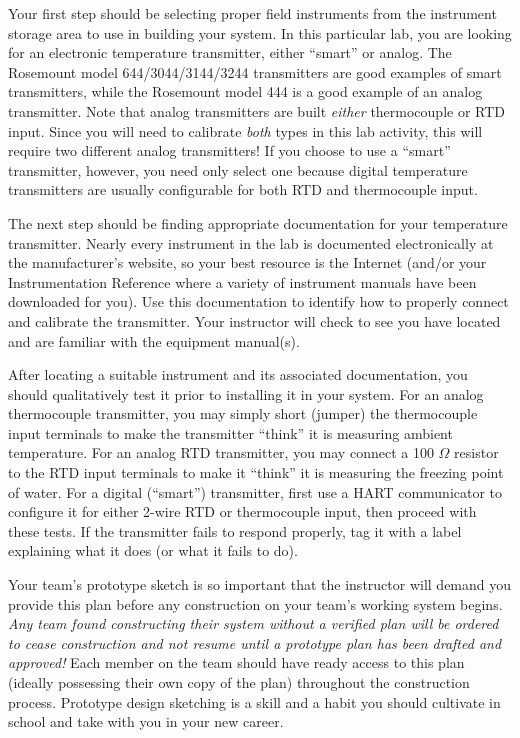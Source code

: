 \begin{itemize}
\vskip 10pt

Your first step should be selecting proper field instruments from the instrument storage area to use in building your system.  In this particular lab, you are looking for an electronic temperature transmitter, either ``smart'' or analog.  The Rosemount model 644/3044/3144/3244 transmitters are good examples of smart transmitters, while the Rosemount model 444 is a good example of an analog transmitter.  Note that analog transmitters are built {\it either} thermocouple or RTD input.  Since you will need to calibrate {\it both} types in this lab activity, this will require two different analog transmitters!  If you choose to use a ``smart'' transmitter, however, you need only select one because digital temperature transmitters are usually configurable for both RTD and thermocouple input.

The next step should be finding appropriate documentation for your temperature transmitter.  Nearly every instrument in the lab is documented electronically at the manufacturer's website, so your best resource is the Internet (and/or your Instrumentation Reference where a variety of instrument manuals have been downloaded for you).  Use this documentation to identify how to properly connect and calibrate the transmitter.  Your instructor will check to see you have located and are familiar with the equipment manual(s).

After locating a suitable instrument and its associated documentation, you should qualitatively test it prior to installing it in your system.  For an analog thermocouple transmitter, you may simply short (jumper) the thermocouple input terminals to make the transmitter ``think'' it is measuring ambient temperature.  For an analog RTD transmitter, you may connect a 100 $\Omega$ resistor to the RTD input terminals to make it ``think'' it is measuring the freezing point of water.  For a digital (``smart'') transmitter, first use a HART communicator to configure it for either 2-wire RTD or thermocouple input, then proceed with these tests.  If the transmitter fails to respond properly, tag it with a label explaining what it does (or what it fails to do).

\vskip 10pt

Your team's prototype sketch is so important that the instructor will demand you provide this plan before any construction on your team's working system begins.  {\it Any team found constructing their system without a verified plan will be ordered to cease construction and not resume until a prototype plan has been drafted and approved!}  Each member on the team should have ready access to this plan (ideally possessing their own copy of the plan) throughout the construction process.  Prototype design sketching is a skill and a habit you should cultivate in school and take with you in your new career.


\end{itemize}
